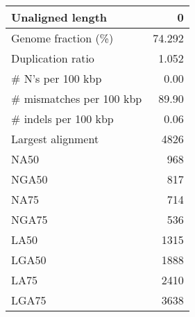 \documentclass[12pt,a4paper]{article}
\begin{document}
\begin{table}[ht]
\begin{center}
\begin{tabular}{|l*{1}{|r}|}
Unaligned length & 0 \\ \hline
Genome fraction (\%) & 74.292 \\ \hline
Duplication ratio & 1.052 \\ \hline
\# N's per 100 kbp & 0.00 \\ \hline
\# mismatches per 100 kbp & 89.90 \\ \hline
\# indels per 100 kbp & 0.06 \\ \hline
Largest alignment & 4826 \\ \hline
NA50 & 968 \\ \hline
NGA50 & 817 \\ \hline
NA75 & 714 \\ \hline
NGA75 & 536 \\ \hline
LA50 & 1315 \\ \hline
LGA50 & 1888 \\ \hline
LA75 & 2410 \\ \hline
LGA75 & 3638 \\ \hline
\end{tabular}
\end{center}
\end{table}
\end{document}
